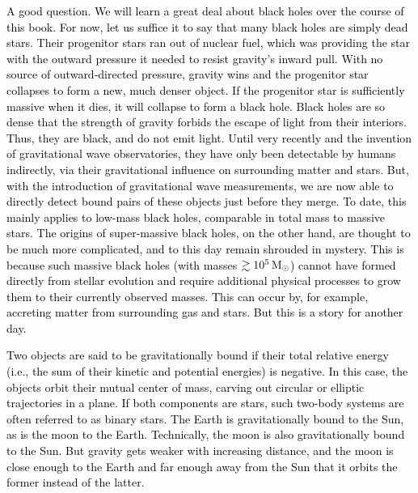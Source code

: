 \documentclass[main.tex]{subfiles}
\begin{document}
\begin{tcolorbox}[sharp corners, colback=red!30, colframe=red!80!blue, title=Box \refstepcounter{educhap1}\label{boxchap1:bhs}\ref{boxchap1:bhs} -- Black Holes]
\par \textcolor{black} {A good question.  We will learn a great deal about black holes over the course of this book.  For now, let us suffice it to say that many black holes are simply dead stars. Their progenitor stars ran out of nuclear fuel, which was providing the star with the outward pressure it needed to resist gravity's inward pull.  With no source of outward-directed pressure, gravity wins and the progenitor star collapses to form a new, much denser object.  If the progenitor star is sufficiently massive when it dies, it will collapse to form a black hole.  %
Black holes are so dense that the strength of gravity forbids the escape of light from their interiors.  Thus, they are black, and do not emit light.  Until very recently and the invention of gravitational wave observatories, they have only been detectable by humans indirectly, via their gravitational influence on surrounding matter and stars.  But, with the introduction of gravitational wave measurements, we are now able to directly detect bound pairs of these objects just before they merge.  To date, this mainly applies to low-mass black holes, comparable in total mass to massive stars.  The origins of super-massive black holes, on the other hand, are thought to be much more complicated, and to this day remain shrouded in mystery.  This is because such massive black holes (with masses $\gtrsim 10^5\,\mathrm{M}_\odot$) cannot have formed directly from stellar evolution and require additional physical processes to grow them to their currently observed masses.  This can occur by, for example, accreting matter from surrounding gas and stars.  But this is a story for another day.}
\end{tcolorbox}

\begin{tcolorbox}[sharp corners, colback=blue!30, colframe=blue!80!blue, title=Box \refstepcounter{educhap1}\label{boxchap1:bs}\ref{boxchap1:bs} -- Gravitationally Bound Pairs of Objects and Binary Star Systems]
\par \textcolor{black} {Two objects are said to be gravitationally bound if their total relative energy (i.e., the sum of their kinetic and potential energies) is negative.  In this case, the objects orbit their mutual center of mass, carving out circular or elliptic trajectories in a plane.  If both components are stars, such two-body systems are often referred to as binary stars.  The Earth is gravitationally bound to the Sun, as is the moon to the Earth.  Technically, the moon is also gravitationally bound to the Sun.  But gravity gets weaker with increasing distance, and the moon is close enough to the Earth and far enough away from the Sun that it orbits the former instead of the latter.}  
\end{tcolorbox}
\end{document}
